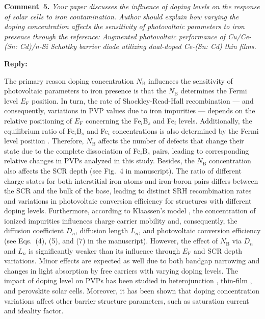 \documentclass[a4paper,fleqn]{cas-sc}
\begin{document}
\vspace{1cm}
\noindent
\textcolor[rgb]{0.00,0.50,1.00}{\textbf{Comment~5.}}
\emph{Your paper discusses the influence of doping levels on the response of solar cells to iron contamination.
Author should explain how varying the doping concentration affects the sensitivity of photovoltaic parameters to iron presence through the reference:
Augmented photovoltaic performance of Cu/Ce-(Sn: Cd)/n-Si Schottky barrier diode utilizing dual-doped Ce-(Sn: Cd) thin films.}

\noindent
\textcolor[rgb]{0.51,0.00,0.00}{\textbf{Reply:}}


The primary reason doping concentration $N_\mathrm{B}$ influences the sensitivity of photovoltaic
parameters to iron presence is that the $N_\mathrm{B}$ determines the Fermi level $E_\mathrm{F}$ position.
In turn, the rate of Shockley-Read-Hall recombination ---
and consequently, variations in PVP values due to iron impurities ---
depends on the relative positioning of $E_\mathrm{F}$ concerning the Fe$_i$B$_s$ and Fe$_i$ levels.
Additionally, the equilibrium ratio of Fe$_i$B$_s$ and Fe$_i$ concentrations is also determined by the Fermi level position \cite{FeB:kinetic,MurphyJAP2011}.
Therefore, $N_\mathrm{B}$ affects the number of defects that change their state due to the complete dissociation of Fe$_i$B$_s$ pairs,
leading to corresponding relative changes in PVPs analyzed in this study.
Besides, the $N_\mathrm{B}$ concentration also affects the SCR depth (see Fig.~4 in manuscript).
The ratio of different charge states for both interstitial iron atoms and iron-boron pairs differs between the SCR and the bulk of the base, leading to distinct SRH recombination rates and variations in photovoltaic conversion efficiency for structures with different doping levels.
Furthermore, according to Klaassen’s model \cite{KLAASSEN953},
the concentration of ionized impurities influences charge carrier mobility and, consequently, the diffusion coefficient $D_n$, diffusion length $L_n$,
and photovoltaic  conversion efficiency (see Eqs.~(4), (5), and (7) in the manuscript).
However, the effect of $N_\mathrm{B}$ via $D_n$ and $L_n$ is significantly weaker than its influence through $E_\mathrm{F}$ and SCR depth variations.
Minor effects are expected as well due to both bandgap narrowing and changes in light absorption by free carriers with varying doping levels.
The impact of doping level on PVPs has been studied in heterojunction \cite{Sultana2024},
thin-film \cite{Akila2024},
and perovskite \cite{MasumMia2025} solar cells.
Moreover, it has been shown \cite{Akila2024} that
doping concentration variations affect other barrier structure parameters, such as saturation current and ideality factor.
\end{document}
